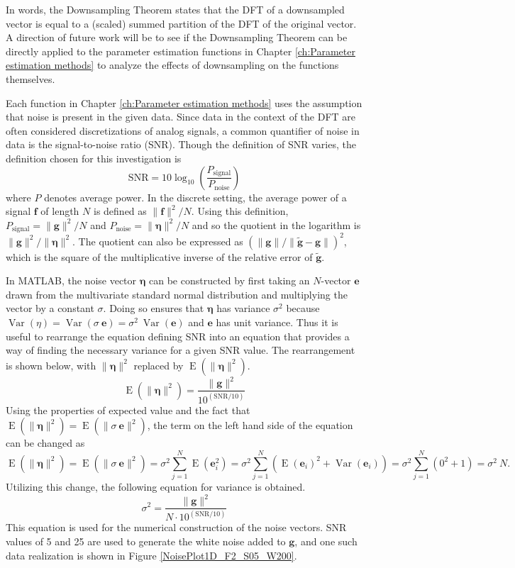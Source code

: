 \documentclass[12pt,notitlepage]{report}
\newcommand{\gVec}{\mathbf{g}}	%
\newcommand{\gnoiseVec}{\widetilde{\mathbf{g}}}	%
\newcommand{\noise}{\eta}	%
\newcommand{\noiseSD}{\sigma}	%
\newcommand{\noiseVec}{\bm{\noise}}	%
\DeclareMathOperator{\Var}{Var}	%
\DeclareMathOperator{\E}{E}	%
\begin{document}
In words, the Downsampling Theorem states that the DFT of a downsampled vector is equal to a (scaled) summed partition of the DFT of the original vector. A direction of future work will be to see if the Downsampling Theorem can be directly applied to the parameter estimation functions in Chapter \ref{ch:Parameter estimation methods} to analyze the effects of downsampling on the functions themselves. \par 
Each function in Chapter \ref{ch:Parameter estimation methods} uses the assumption that noise is present in the given data. Since data in the context of the DFT are often considered discretizations of analog signals, a common quantifier of noise in data is the signal-to-noise ratio (SNR). Though the definition of SNR varies, the definition chosen for this investigation is
\begin{equation}
\label{eq:SNR}
\text{SNR} = 10\log_{10}\left(\frac{P_{\text{signal}}}{P_{\text{noise}}}\right)
\end{equation}
where $P$ denotes average power. In the discrete setting, the average power of a signal $\mathbf{f}$ of length $N$ is defined as $\|\mathbf{f}\|^2/N$. Using this definition, $P_{\text{signal}} = \|\gVec\|^2/N$ and $P_{\text{noise}} = \|\noiseVec\|^2/N$ and so the quotient in the logarithm is $\|\gVec\|^2/\|\noiseVec\|^2$. The quotient can also be expressed as $(\|\gVec\|/\|\gnoiseVec - \gVec\|)^2$, which is the square of the multiplicative inverse of the relative error of $\gnoiseVec$. \par
In MATLAB, the noise vector $\noiseVec$ can be constructed by first taking an $N$-vector $\mathbf{e}$ drawn from the multivariate standard normal distribution and multiplying the vector by a constant $\noiseSD$. Doing so ensures that $\noiseVec$ has variance $\noiseSD^2$ because $\Var(\noise) = \Var(\noiseSD\:\mathbf{e}) = \noiseSD^2\:\Var(\mathbf{e})$ and $\mathbf{e}$ has unit variance. Thus it is useful to rearrange the equation defining SNR into an equation that provides a way of finding the necessary variance for a given SNR value. The rearrangement is shown below, with $\|\noiseVec\|^2$ replaced by $\E(\|\noiseVec\|^2)$.
\[\E(\|\noiseVec\|^2) = \frac{\|\gVec\|^2}{10^{(\text{SNR}/10)}}\]
Using the properties of expected value and the fact that $\E(\|\noiseVec\|^2) = \E(\|\noiseSD\:\mathbf{e}\|^2)$, the term on the left hand side of the equation can be changed as
\[\E(\|\noiseVec\|^2) = \E(\|\noiseSD\:\mathbf{e}\|^2) = \noiseSD^2 \sum_{j=1}^N \E(\mathbf{e}_i^2) = \noiseSD^2 \sum_{j=1}^N \left(\E(\mathbf{e}_i)^2 + \Var(\mathbf{e}_i)\right) = \noiseSD^2 \sum_{j=1}^N \left(0^2 + 1\right) = \noiseSD^2\:N.\]
Utilizing this change, the following equation for variance is obtained.
\begin{equation}
\label{eq:Var}
\noiseSD^2 = \frac{\|\gVec\|^2}{N \cdot 10^{(\text{SNR}/10)}}
\end{equation}
This equation is used for the numerical construction of the noise vectors. SNR values of 5 and 25 are used to generate the white noise added to $\gVec$, and one such data realization is shown in Figure \ref{NoisePlot1D_F2_S05_W200}. \par
\end{document}
